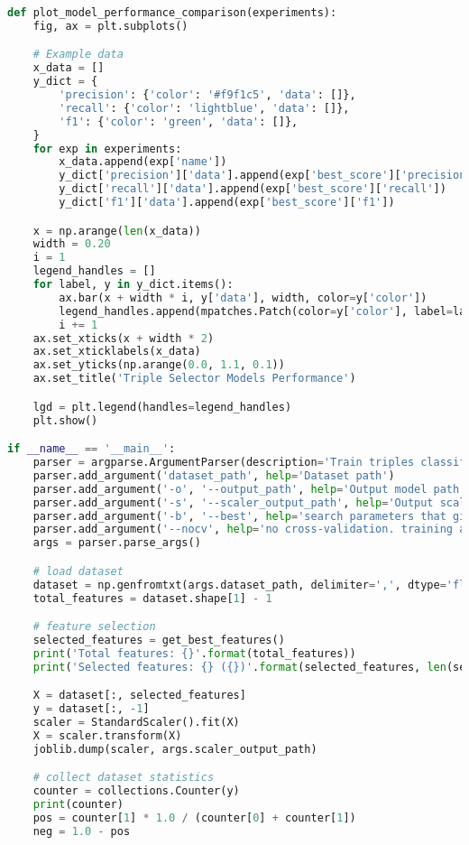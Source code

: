 \begin{lstlisting}[language=Python]
def plot_model_performance_comparison(experiments):
    fig, ax = plt.subplots()

    # Example data
    x_data = []
    y_dict = {
        'precision': {'color': '#f9f1c5', 'data': []},
        'recall': {'color': 'lightblue', 'data': []},
        'f1': {'color': 'green', 'data': []},
    }
    for exp in experiments:
        x_data.append(exp['name'])
        y_dict['precision']['data'].append(exp['best_score']['precision'])
        y_dict['recall']['data'].append(exp['best_score']['recall'])
        y_dict['f1']['data'].append(exp['best_score']['f1'])

    x = np.arange(len(x_data))
    width = 0.20
    i = 1
    legend_handles = []
    for label, y in y_dict.items():
        ax.bar(x + width * i, y['data'], width, color=y['color'])
        legend_handles.append(mpatches.Patch(color=y['color'], label=label))
        i += 1
    ax.set_xticks(x + width * 2)
    ax.set_xticklabels(x_data)
    ax.set_yticks(np.arange(0.0, 1.1, 0.1))
    ax.set_title('Triple Selector Models Performance')

    lgd = plt.legend(handles=legend_handles)
    plt.show()

if __name__ == '__main__':
    parser = argparse.ArgumentParser(description='Train triples classifier')
    parser.add_argument('dataset_path', help='Dataset path')
    parser.add_argument('-o', '--output_path', help='Output model path', default='triples-classifier-model.pkl')
    parser.add_argument('-s', '--scaler_output_path', help='Output scaler path', default='triples-classifier-scaler.pkl')
    parser.add_argument('-b', '--best', help='search parameters that gives best model', action='store_true')
    parser.add_argument('--nocv', help='no cross-validation. training accuracy only', action='store_true')
    args = parser.parse_args()

    # load dataset
    dataset = np.genfromtxt(args.dataset_path, delimiter=',', dtype='float32')
    total_features = dataset.shape[1] - 1

    # feature selection
    selected_features = get_best_features()
    print('Total features: {}'.format(total_features))
    print('Selected features: {} ({})'.format(selected_features, len(selected_features)))

    X = dataset[:, selected_features]
    y = dataset[:, -1]
    scaler = StandardScaler().fit(X)
    X = scaler.transform(X)
    joblib.dump(scaler, args.scaler_output_path)

    # collect dataset statistics
    counter = collections.Counter(y)
    print(counter)
    pos = counter[1] * 1.0 / (counter[0] + counter[1])
    neg = 1.0 - pos


\end{lstlisting}
